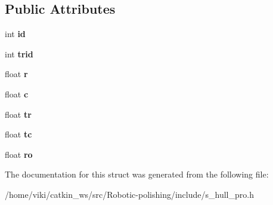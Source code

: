 \subsection*{Public Attributes}
\begin{DoxyCompactItemize}
\item 
int {\bfseries id}\hypertarget{structShx_a88361268df72e47971096e2aca1d9b33}{}\label{structShx_a88361268df72e47971096e2aca1d9b33}

\item 
int {\bfseries trid}\hypertarget{structShx_ad525581367bde52c314b80436eacea14}{}\label{structShx_ad525581367bde52c314b80436eacea14}

\item 
float {\bfseries r}\hypertarget{structShx_a2c5f7fcdc47a56a4b18037fcac799bc0}{}\label{structShx_a2c5f7fcdc47a56a4b18037fcac799bc0}

\item 
float {\bfseries c}\hypertarget{structShx_ac14431846952caced547bf1829c12867}{}\label{structShx_ac14431846952caced547bf1829c12867}

\item 
float {\bfseries tr}\hypertarget{structShx_a8e418b50a6e20b62d85b03fcf6f2f895}{}\label{structShx_a8e418b50a6e20b62d85b03fcf6f2f895}

\item 
float {\bfseries tc}\hypertarget{structShx_a2d1b1f1295f1ba689dad05f5ee86b11a}{}\label{structShx_a2d1b1f1295f1ba689dad05f5ee86b11a}

\item 
float {\bfseries ro}\hypertarget{structShx_a70c68a75a8f0c1a69d64b6f50e046f9a}{}\label{structShx_a70c68a75a8f0c1a69d64b6f50e046f9a}

\end{DoxyCompactItemize}


The documentation for this struct was generated from the following file\+:\begin{DoxyCompactItemize}
\item 
/home/viki/catkin\+\_\+ws/src/\+Robotic-\/polishing/include/s\+\_\+hull\+\_\+pro.\+h\end{DoxyCompactItemize}
